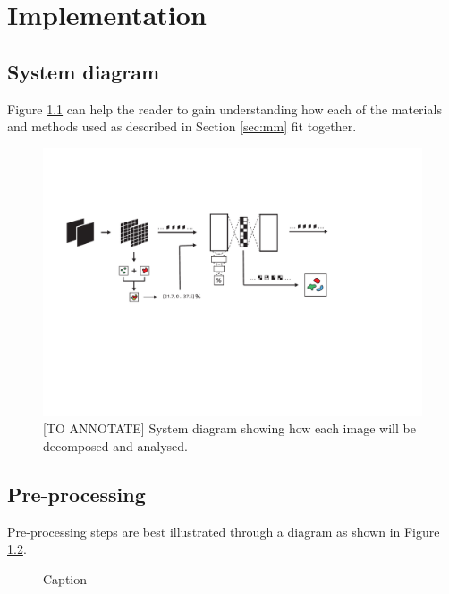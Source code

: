 \chapter{Implementation} \label{sec:implementation}

\section{System diagram}

Figure \ref{fig:system} can help the reader to gain understanding how each of the materials and methods used as described in Section \ref{sec:mm} fit together.

\begin{figure}[h!]
    \centering
    \includegraphics[width=\textwidth]{dissertation/figures/system_diagram.pdf}
    \caption{[TO ANNOTATE] System diagram showing how each image will be decomposed and analysed.}
    \label{fig:system}
\end{figure}

\section{Pre-processing}

Pre-processing steps are best illustrated through a diagram as shown in Figure \ref{fig:preprocessing}.

\begin{figure}[h]
    \centering
    \caption{Caption}
    \label{fig:preprocessing}
\end{figure}

